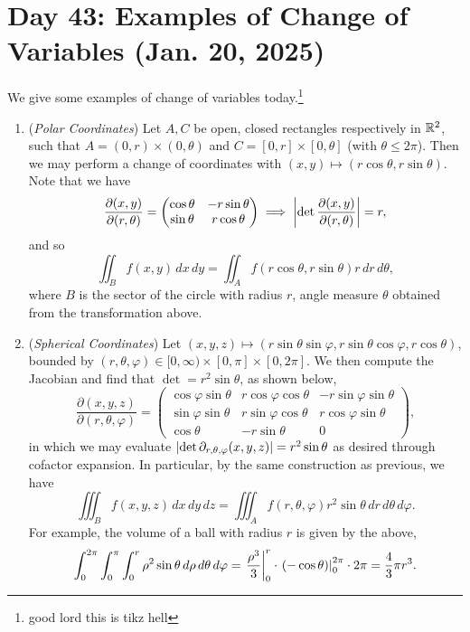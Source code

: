 \section{Day 43: Examples of Change of Variables (Jan. 20, 2025)}
We give some examples of change of variables today.\footnote{good lord this is tikz hell}
\begin{enumerate}[label=(\alph*)]
    \item (\textit{Polar Coordinates}) Let $A, C$ be open, closed rectangles respectively in $\mathbb R^2$, such that $A = (0, r) \times (0, \theta)$ and $C = [0, r] \times [0, \theta]$ (with $\theta \leq 2\pi$). Then we may perform a change of coordinates with $(x, y) \mapsto (r \cos \theta, r \sin \theta)$. Note that we have
    \[ \frac{\partial(x, y)}{\partial(r, \theta)} = \begin{pmatrix} \cos \theta & - r \sin \theta \\ \sin \theta & r \cos \theta \end{pmatrix} \implies \left\lvert \det \frac{\partial(x, y)}{\partial(r, \theta)} \right\rvert = r, \]
    and so
    \[ \iint_B f(x, y) \, dx \, dy = \iint_A f(r \cos \theta, r \sin \theta) r \, dr \, d\theta, \]
    where $B$ is the sector of the circle with radius $r$, angle measure $\theta$ obtained from the transformation above.
    \item (\textit{Spherical Coordinates}) Let $(x, y, z) \mapsto (r \sin \theta \sin \varphi, r \sin \theta \cos \varphi, r \cos \theta)$, bounded by $(r, \theta, \varphi) \in [0, \infty) \times [0, \pi] \times [0, 2\pi]$. We then compute the Jacobian and find that $\det = r^2 \sin \theta$, as shown below,
    \[ \frac{\partial(x, y, z)}{\partial(r, \theta, \varphi)} = \begin{pmatrix} \cos \varphi \sin \theta & r \cos \varphi \cos \theta & - r \sin \varphi \sin \theta \\ \sin \varphi \sin \theta & r \sin \varphi \cos \theta & r \cos \varphi \sin \theta \\ \cos \theta & - r \sin \theta & 0 \end{pmatrix}, \]
    in which we may evaluate $\left\lvert \det \partial_{r, \theta, \varphi}(x, y, z) \right\rvert = r^2 \sin \theta$ as desired through cofactor expansion. In particular, by the same construction as previous, we have
    \[ \iiint_B f(x, y, z) \, dx \, dy \, dz = \iiint_A f(r, \theta, \varphi) r^2 \sin \theta \, dr \, d\theta \, d\varphi. \]
    For example, the volume of a ball with radius $r$ is given by the above,
    \[ \int_0^{2\pi} \int_0^\pi \int_0^r \rho^2 \sin \theta \, d\rho \, d\theta \, d\varphi = \left.\frac{\rho^3}{3}\right\rvert_{0}^{r} \cdot \left.(-\cos \theta)\right\rvert_{0}^{2\pi} \cdot 2\pi = \frac{4}{3} \pi r^3. \]

\end{enumerate}
